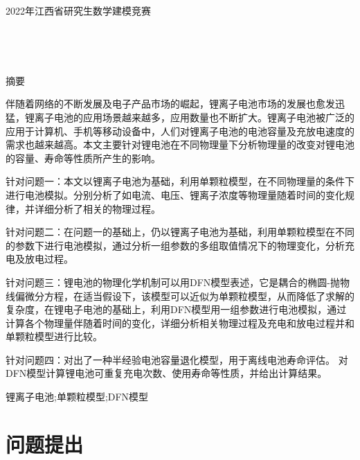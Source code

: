 \documentclass[12pt]{ctexart}%
\begin{document}
		\begin{titlepage}
			\centering
			\vspace*{5em}
			\begin{Huge}2022年江西省研究生数学建模竞赛
			\end{Huge}
			
			\vskip 5cm
			
			\underline{}\\
			\vskip 0.9cm
			
			\underline{}\\
			\vskip 2cm
					 
		\end{titlepage}
\newpage

\begin{center}
	\large{摘\quad 要}
\end{center}

伴随着网络的不断发展及电子产品市场的崛起，锂离子电池市场的发展也愈发迅猛，锂离子电池的应用场景越来越多，应用数量也不断扩大。锂离子电池被广泛的应用于计算机、手机等移动设备中，人们对锂离子电池的电池容量及充放电速度的需求也越来越高。本文主要针对锂电池在不同物理量下分析物理量的改变对锂电池的容量、寿命等性质所产生的影响。

针对问题一：本文以锂离子电池为基础，利用单颗粒模型，在不同物理量的条件下进行电池模拟。分别分析了如电流、电压、锂离子浓度等物理量随着时间的变化规律，并详细分析了相关的物理过程。

针对问题二：在问题一的基础上，仍以锂离子电池为基础，利用单颗粒模型在不同的参数下进行电池模拟，通过分析一组参数的多组取值情况下的物理变化，分析充电及放电过程。

针对问题三：锂电池的物理化学机制可以用DFN模型表述，它是耦合的椭圆-抛物线偏微分方程，在适当假设下，该模型可以近似为单颗粒模型，从而降低了求解的复杂度，在锂电子电池的基础上，利用DFN模型用一组参数进行电池模拟，通过计算各个物理量伴随着时间的变化，详细分析相关物理过程及充电和放电过程并和单颗粒模型进行比较。

针对问题四：对出了一种半经验电池容量退化模型，用于离线电池寿命评估。 对DFN模型计算锂电池可重复充电次数、使用寿命等性质，并给出计算结果。%

\vskip 1cm
锂离子电池;单颗粒模型;DFN模型
\newpage


\section{问题提出}
\end{document}
